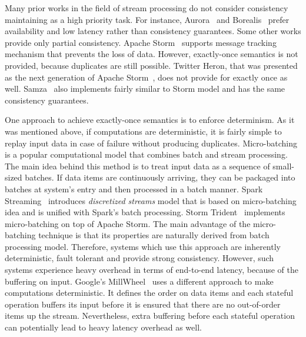 
\label {fs-related-seciton}

Many prior works in the field of stream processing do not consider consistency maintaining as a high priority task. For instance, Aurora~\cite{Abadi:2003:ANM:950481.950485} and Borealis~\cite{abadi2005design} prefer availability and low latency rather than consistency guarantees. Some other works provide only partial consistency. Apache Storm~\cite{apache:storm} supports message tracking mechanism that prevents the loss of data. However, exactly-once semantics is not provided, because duplicates are still possible. Twitter Heron, that was presented as the next generation of Apache Storm~\cite{Kulkarni:2015:THS:2723372.2742788}, does not provide for exactly once as well. Samza~\cite{Noghabi:2017:SSS:3137765.3137770} also implements fairly similar to Storm model and has the same consistency guarantees.  

One approach to achieve exactly-once semantics is to enforce determinism. As it was mentioned above, if computations are deterministic, it is fairly simple to replay input data in case of failure without producing duplicates. Micro-batching is a popular computational model that combines batch and stream processing. The main idea behind this method is to treat input data as a sequence of small-sized batches. If data items are continuously arriving, they can be packaged into batches at system's entry and then processed in a batch manner. Spark Streaming~\cite{Zaharia:2012:DSE:2342763.2342773} introduces {\it discretized streams} model that is based on micro-batching idea and is unified with Spark's batch processing. Storm Trident~\cite{apache:storm:trident} implements micro-batching on top of Apache Storm. The main advantage of the micro-batching technique is that its properties are naturally derived from batch processing model. Therefore, systems which use this approach are inherently deterministic, fault tolerant and provide strong consistency. However, such systems experience heavy overhead in terms of end-to-end latency, because of the buffering on input. Google's MillWheel~\cite{Akidau:2013:MFS:2536222.2536229} uses a different approach to make computations deterministic. It defines the order on data items and each stateful operation buffers its input before it is ensured that there are no out-of-order items up the stream. Nevertheless, extra buffering before each stateful operation can potentially lead to heavy latency overhead as well.   

